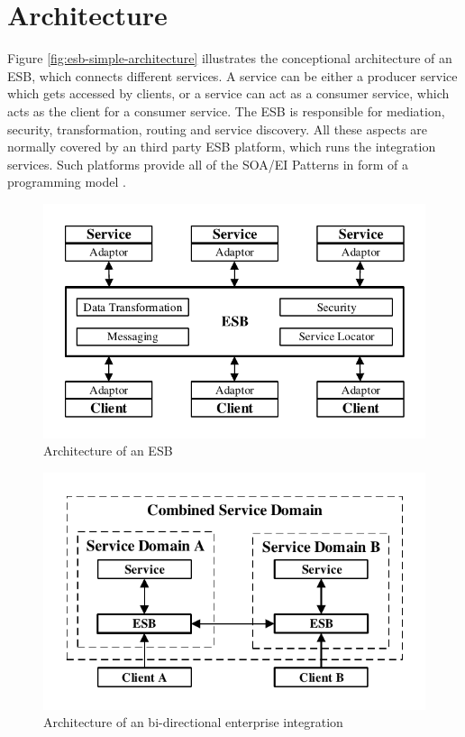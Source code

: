 \section{Architecture}
\label{sec:esb-architecture}
Figure \vref{fig:esb-simple-architecture} illustrates the conceptional architecture of an ESB, which connects different services. A service can be either a producer service which gets accessed by clients, or a service can act as a consumer service, which acts as the client for a consumer service. The ESB is responsible for mediation, security, transformation, routing and service discovery. All these aspects are normally covered by an third party ESB platform, which runs the integration services. Such platforms provide all of the SOA/EI Patterns in form of a programming model \cite{EsbSoa2018, MediationESB2005}.

\begin{figure}[htbp]
	\centering
	\includegraphics[scale=1]{images/esb-simple-architecture.pdf}
	\caption{Architecture of an ESB}
	\label{fig:esb-simple-architecture}
\end{figure} 

\begin{figure}[htbp]
	\centering
	\includegraphics[scale=1]{images/esb-bidirectional-integration.pdf}
	\caption{Architecture of an bi-directional enterprise integration}
	\label{fig:esb-bidirectional-integration}
\end{figure} 

